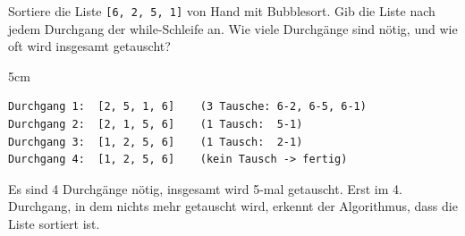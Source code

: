 \question[4]
Sortiere die Liste \texttt{[6, 2, 5, 1]} von Hand mit Bubblesort.
Gib die Liste nach jedem Durchgang der while-Schleife an.
Wie viele Durchgänge sind nötig, und wie oft wird insgesamt getauscht?

\begin{solutionbox}{5cm}
\begin{lstlisting}[language={}]
Durchgang 1:  [2, 5, 1, 6]    (3 Tausche: 6-2, 6-5, 6-1)
Durchgang 2:  [2, 1, 5, 6]    (1 Tausch:  5-1)
Durchgang 3:  [1, 2, 5, 6]    (1 Tausch:  2-1)
Durchgang 4:  [1, 2, 5, 6]    (kein Tausch -> fertig)
\end{lstlisting}
Es sind 4 Durchgänge nötig, insgesamt wird 5-mal getauscht.
Erst im 4. Durchgang, in dem nichts mehr getauscht wird, erkennt der Algorithmus,
dass die Liste sortiert ist.
\end{solutionbox}
